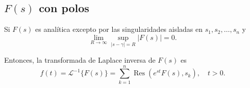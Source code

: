 



\subsection{\texorpdfstring{$F(s)$}{TEXT} con polos}

\begin{teorema}
    Si $F(s)$ es analítica excepto por las singularidades aisladas en $s_1, s_2, \dots, s_n$ y 
    $$\lim_{R \to \infty} \sup_{ |s - \gamma| = R} |F(s)| =  0.$$
   
   Entonces, la transformada de Laplace inversa de $F(s)$ es
    $$f(t) = \mathcal{L}^{-1}\{F(s)\} = \sum_{k= 1}^n \operatorname{Res}(e^{st} F(s), s_k), \quad t > 0.$$
\end{teorema}

